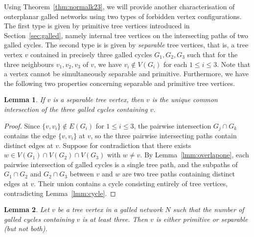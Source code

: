 \documentclass[pdflatex,sn-mathphys-num]{sn-jnl}
\theoremstyle{thmstyleone}%
\theoremstyle{thmstyletwo}%
\newtheorem{lemma}{Lemma}
\theoremstyle{thmstylethree}%
\begin{document}
Using Theorem~\ref{thm:normalk23}, we will provide another characterisation of outerplanar galled networks using two types of forbidden vertex configurations. The first type is given by primitive tree vertices introduced in Section~\ref{sec:galled}, namely internal tree vertices on the intersecting paths of two galled cycles.
The second type is is given by {\em separable} tree vertices, that is, a tree vertex $v$ contained in precisely three galled cycles $G_1,G_2,G_3$ such that for the three neighbours $v_1,v_2,v_3$ of $v$, we have $v_i\not \in V(G_i)$ for each $1\le i \le 3$.  Note that a vertex cannot be simultaneously separable and primitive. Furthermore, we have the following two properties concerning separable and primitive tree vertices. 



\begin{lemma} \label{lmm:sepuni}
If $v$ is a separable tree vertex, then $v$ is the unique common intersection of the three galled cycles containing $v$.
\end{lemma}

\begin{proof}
Since $\{v, v_i\} \notin E(G_i)$ for $1 \le i \le 3$, the pairwise intersection $G_j \cap G_k$ contains the edge $\{v, v_i\}$ at $v$, so the three pairwise intersecting paths contain distinct edges at $v$. Suppose for contradiction that there exists $w \in V(G_1) \cap V(G_2) \cap V(G_3)$ with $w \neq v$. By Lemma~\ref{lmm:overlapone}, each pairwise intersection of galled cycles is a single tree path, and the subpaths of $G_1 \cap G_2$ and $G_2 \cap G_3$ between $v$ and $w$ are two tree paths containing distinct edges at $v$. Their union contains a cycle consisting entirely of tree vertices, contradicting Lemma~\ref{lmm:cycle}.
\end{proof}

\begin{lemma}\label{lmm:three-galled-cycles}
Let $v$ be a tree vertex in a galled network $N$ such that the number of galled cycles containing $v$ is at least three. 
Then $v$ is either primitive or separable (but not both).
\end{lemma}
\end{document}
